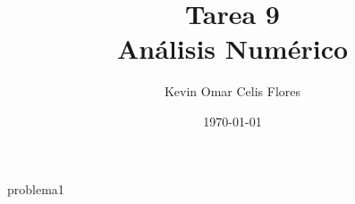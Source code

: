 \documentclass[11pt, oneside]{article}
\title{Tarea 9\\Análisis Numérico}
\author{Kevin Omar Celis Flores}
\date{\today}
\begin{document}
\maketitle

{problema1}
\end{document}
